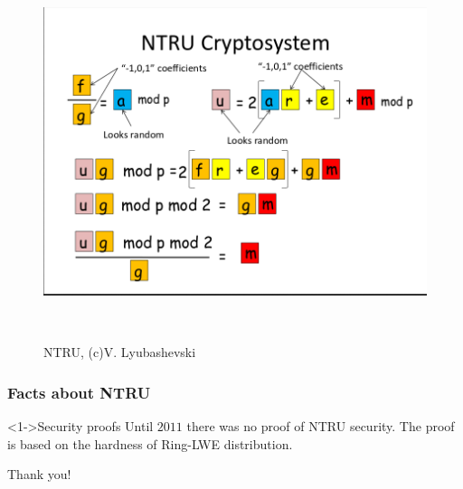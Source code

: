 \documentclass{beamer}
\begin{document}
\begin{frame}
    \begin{figure}
            \includegraphics[width=12cm,height=11cm,keepaspectratio]{img/vadim5.png}
            \caption{NTRU, (c)V. Lyubashevski}
        \end{figure}
\end{frame}

\begin{frame}
    \frametitle{Facts about NTRU}
    \begin{block}<1->{Security proofs}
        Until $2011$ there was no proof of NTRU security. The proof is based on the hardness of Ring-LWE distribution.
    \end{block}
\end{frame}
\begin{frame}
\Huge{\centerline{Thank you!}}
\end{frame}
\end{document}
